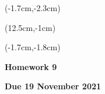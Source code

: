 \documentclass[12pt, oneside]{article}
\begin{document}
\begin{textblock*}{4cm}(-1.7cm,-2.3cm)
\end{textblock*}

\begin{textblock*}{8cm}(12.5cm,-1cm)
\end{textblock*}
\begin{textblock*}{13.5cm}(-1.7cm,-1.8cm)
\end{textblock*}

\vspace{1cm}

\begin{center}
\textbf{\Large Homework 9}

\textbf{Due 19 November 2021}
\end{center}
\end{document}
